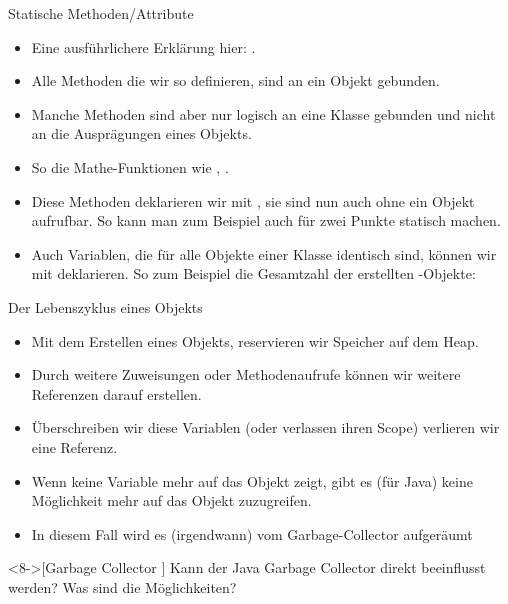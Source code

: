 \begin{frame}[fragile]{Statische Methoden/Attribute}
\begin{itemize}[<+(1)->]
    \item<1-> Eine ausführlichere Erklärung hier: .
    \item Alle Methoden die wir so definieren, sind an ein Objekt gebunden.
    \item Manche Methoden sind aber nur logisch an eine Klasse gebunden\pause{} und nicht an die Ausprägungen eines Objekts.
    \item So die Mathe-Funktionen wie , .
    \item Diese Methoden deklarieren wir mit ,\pause{} sie sind nun auch ohne ein Objekt aufrufbar.\pause{} So kann man zum Beispiel auch  für zwei Punkte statisch machen.
    \item Auch Variablen, die für alle Objekte einer Klasse identisch sind,\pause{} können wir mit  deklarieren.\pause{} So zum Beispiel die Gesamtzahl der erstellten -Objekte: 
\end{itemize}
\end{frame}

\begin{frame}[fragile]{Der Lebenszyklus eines Objekts}
    \begin{itemize}[<+(1)->]
        \item Mit dem Erstellen eines Objekts, reservieren wir Speicher auf dem Heap.
        \item Durch weitere Zuweisungen\pause{} oder Methodenaufrufe können wir weitere Referenzen darauf erstellen.
        \item Überschreiben wir diese Variablen (oder verlassen ihren Scope) verlieren wir eine Referenz.
        \item Wenn keine Variable mehr auf das Objekt zeigt,\pause{} gibt es (für Java) keine Möglichkeit mehr auf das Objekt zuzugreifen.
        \item In diesem Fall wird es (irgendwann) vom Garbage-Collector aufgeräumt
    \end{itemize}
\ifull
    \begin{exercise}<8->[Garbage Collector ]
        \pause{}Kann der Java Garbage Collector direkt beeinflusst werden? Was sind die Möglichkeiten?
    \end{exercise}
\fi{}
\end{frame}

